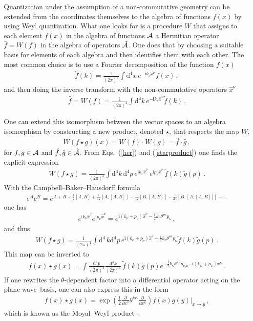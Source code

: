 \documentclass{article}
\def\beqn{\begin{eqnarray}}
\def\eeqn{\end{eqnarray}}
\begin{document}
Quantization under the assumption of a non-commutative geometry can be extended from
the coordinates themselves to the algebra of functions $f(x)$ by using Weyl quantization. What one
looks for is a procedure $W$ that assigns to each element $f(x)$ in the algebra of functions ${\cal A}$ a 
Hermitian operator $\hat f = W(f)$ in the algebra of operators $\hat {\cal A}$. One does that 
by choosing a suitable basis for elements of each algebra and then identifies them with each other. The most 
common choice%
is to use a Fourier decomposition of the function $f(x)$
\beqn
\tilde f(k) = \frac{1}{(2 \pi)^4} \int \mathrm{d}^4 x \, e^{-\mathrm{i} k_\nu x^\nu} f(x) \,, \label{hin}
\eeqn
and then doing the inverse transform with the non-commutative operators $\hat x^\nu$
\beqn
\hat f = W(f) = \frac{1}{(2 \pi)^4} \int \mathrm{d}^4 k \, e^{-\mathrm{i} k_\nu \hat x^\nu} \tilde f(k) \,. \label{her}
\eeqn

One can extend this isomorphism between the vector spaces to an algebra isomorphism by constructing
a new product, denoted $\star$, that respects the map $W$, 
\beqn
W(f \star g)(x) = W(f) \cdot W(g) = \hat f \cdot \hat g \,,  \label{starproduct}
\eeqn
for $f,g \in {\cal A}$ and $\hat f, \hat g \in \hat {\cal A}$. From Eqs.~(\ref{her}) and (\ref{starproduct}) one
finds the explicit expression
\beqn
W(f \star g) = \frac{1}{(2 \pi)^4} \int \mathrm{d}^4 k \, \mathrm{d}^4
p \, e^{\mathrm{i} k_\nu \hat x^\nu} \, e^{\mathrm{i} p_\nu \hat
  x^\nu} \, \tilde f(k) \tilde g(p) \,.
\eeqn
With the Campbell--Baker--Hausdorff formula
\beqn
e^Ae^B = e^{A + B + \frac{1}{2} [A,B] + \frac{1}{12}[A,[A,B]] - \frac{1}{12}[B,[A,B]] - \frac{1}{24} [B,[A,[A,B]]] + \dots} 
\eeqn
one has
\beqn
e^{\mathrm{i} k_\nu \hat x^\nu} 
e^{\mathrm{i} p_\nu \hat x^\nu} = 
e^{\mathrm{i} (k_\nu + p_\nu) \hat x^\nu - \frac{\mathrm{i}}{2} k_\nu \theta^{\nu\kappa} p_\kappa}\,,
\eeqn
and thus
\beqn
W(f \star g) = \frac{1}{(2 \pi)^4} \int \mathrm{d}^4 \, k \mathrm{d}^4
p \, e^{\mathrm{i} (k_\nu + p_\nu) \hat x^\nu - \frac{\mathrm{i}}{2} k_\nu \theta^{\nu\kappa} p_\kappa}
\tilde f(k) \tilde g(p) \,.
\eeqn
This map can be inverted to
\beqn
f(x) \star g(x) = \int \frac{\mathrm{d}^4 p}{(2 \pi)^4 }
\frac{\mathrm{d}^4 k}{(2 \pi)^4 } \, \tilde f(k) \tilde g (p)
e^{- \frac{\mathrm{i}}{2} k_{\kappa} \theta^{\kappa \nu} p_\nu} e^{- \mathrm{i} ( k_{\kappa} + p_\kappa)x^\kappa}   \label{fstarg} \,.
\eeqn
If one rewrites the $\theta$-dependent factor into a differential operator acting on the plane-wave--basis, one can also express this in the form
\beqn
f(x) \star g(x) = \exp \left( \frac{\mathrm{i}}{2} \frac{\partial}{\partial x^\nu} \theta^{\nu\kappa} \frac{\partial}{\partial x^\kappa} \right)
f(x) g(y) \Big|_{x\to y} \,,
\eeqn
which is known as the Moyal--Weyl product~\cite{Moyal:1949sk}.
\end{document}
